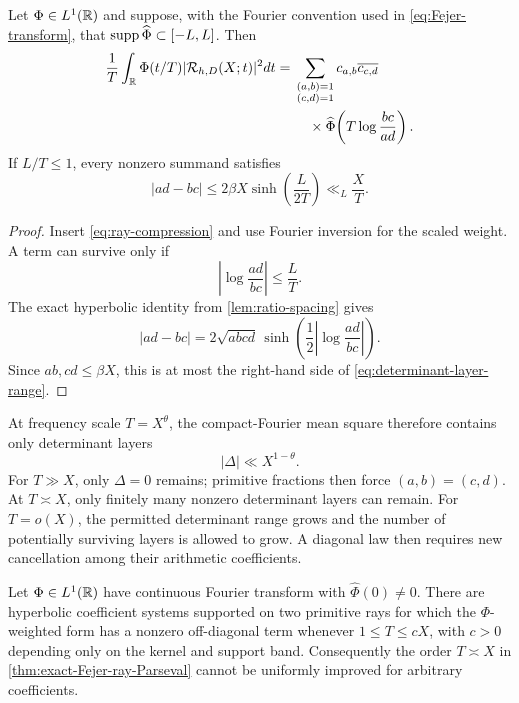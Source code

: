 \begin{proposition}
\label{prop:determinant-layers}
Let $\Phi\in L^1(\mathbb R)$ and suppose, with the Fourier convention used in
\eqref{eq:Fejer-transform}, that
$\operatorname{supp}\widehat\Phi\subset[-L,L]$.  Then
\begin{equation}
 \begin{aligned}
 \frac1T\int_\mathbb R\Phi(t/T)|\mathcal R_{h,D}(X;t)|^2dt
 ={}&\sum_{\substack{(a,b)=1\\(c,d)=1}}
 c_{a,b}\overline{c_{c,d}}\\
 &\quad\times
 \widehat\Phi\!\left(T\log\frac{bc}{ad}\right).
 \end{aligned}
 \label{eq:compact-Fourier-layer-identity}
\end{equation}
If $L/T\leq1$, every nonzero summand satisfies
\begin{equation}
 |ad-bc|
 \leq2\beta X\sinh\!\left(\frac{L}{2T}\right)
 \ll_L\frac XT.
 \label{eq:determinant-layer-range}
\end{equation}
\end{proposition}

\begin{proof}
Insert \eqref{eq:ray-compression} and use Fourier inversion for the scaled
weight.  A term can survive only if
\[
 \left|\log\frac{ad}{bc}\right|\leq\frac LT.
\]
The exact hyperbolic identity from \cref{lem:ratio-spacing} gives
\[
 |ad-bc|
 =2\sqrt{abcd}\,
 \sinh\!\left(\frac12\left|\log\frac{ad}{bc}\right|\right).
\]
Since $ab,cd\leq\beta X$, this is at most the right-hand side of
\eqref{eq:determinant-layer-range}.
\end{proof}

At frequency scale $T=X^\theta$, the compact-Fourier mean square therefore
contains only determinant layers
\[
 |\Delta|\ll X^{1-\theta}.
\]
For $T\gg X$, only $\Delta=0$ remains; primitive fractions then force
$(a,b)=(c,d)$.  At $T\asymp X$, only finitely many nonzero determinant
layers can remain.  For $T=o(X)$, the permitted determinant range grows
and the number of potentially surviving layers is allowed to grow.  A
diagonal law then requires new cancellation among their arithmetic
coefficients.

\begin{proposition}
\label{prop:X-threshold-sharp}
Let $\Phi\in L^1(\mathbb R)$ have continuous Fourier transform with
$\widehat\Phi(0)\ne0$.  There are hyperbolic coefficient systems supported
on two primitive rays for which the $\Phi$-weighted form has a nonzero
off-diagonal term whenever $1\leq T\leq cX$, with $c>0$ depending only on the
kernel and support band.
Consequently the order $T\asymp X$ in
\cref{thm:exact-Fejer-ray-Parseval} cannot be uniformly improved for
arbitrary coefficients.
\end{proposition}

